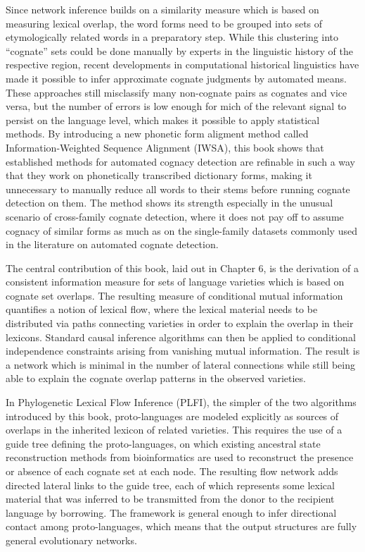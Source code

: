 Since network inference builds on a similarity measure which is based on measuring lexical overlap, the word forms need to be grouped into sets of etymologically related words in a preparatory step. While this clustering into ``cognate'' sets could be done manually by experts in the linguistic history of the respective region, recent developments in computational historical linguistics have made it possible to infer approximate cognate judgments by automated means. These approaches still misclassify many non-cognate pairs as cognates and vice versa, but the number of errors is low enough for mich of the relevant signal to persist on the language level, which makes it possible to apply statistical methods. By introducing a new phonetic form aligment method called Information-Weighted Sequence Alignment (IWSA), this book shows that established methods for automated cognacy detection are refinable in such a way that they work on phonetically transcribed dictionary forms, making it unnecessary to manually reduce all words to their stems before running cognate detection on them. The method shows its strength especially in the unusual scenario of cross-family cognate detection, where it does not pay off to assume cognacy of similar forms as much as on the single-family datasets commonly used in the literature on automated cognate detection.

The central contribution of this book, laid out in Chapter 6, is the derivation of a consistent information measure for sets of language varieties which is based on cognate set overlaps. The resulting measure of conditional mutual information quantifies a notion of lexical flow, where the lexical material needs to be distributed via paths connecting varieties in order to explain the overlap in their lexicons. Standard causal inference algorithms can then be applied to conditional independence constraints arising from vanishing mutual information. The result is a network which is minimal in the number of lateral connections while still being able to explain the cognate overlap patterns in the observed varieties.

In Phylogenetic Lexical Flow Inference (PLFI), the simpler of the two algorithms introduced by this book, proto-languages are modeled explicitly as sources of overlaps in the inherited lexicon of related varieties. This requires the use of a guide tree defining the proto-languages, on which existing ancestral state reconstruction methods from bioinformatics are used to reconstruct the presence or absence of each cognate set at each node. The resulting flow network adds directed lateral links to the guide tree, each of which represents some lexical material that was inferred to be transmitted from the donor to the recipient language by borrowing. The framework is general enough to infer directional contact among proto-languages, which means that the output structures are fully general evolutionary networks.

